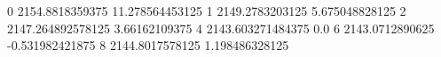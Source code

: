 0 2154.8818359375 11.278564453125
1 2149.2783203125 5.675048828125
2 2147.264892578125 3.66162109375
4 2143.603271484375 0.0
6 2143.0712890625 -0.531982421875
8 2144.8017578125 1.198486328125
